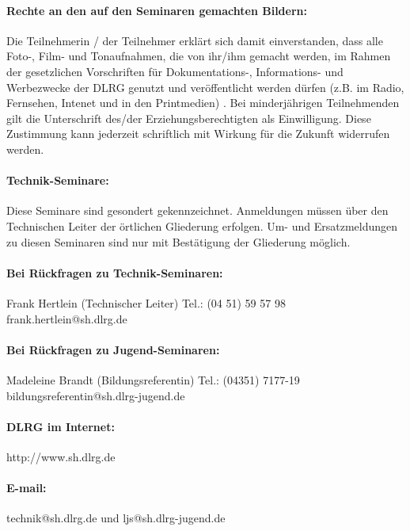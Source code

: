 \paragraph{Rechte an den auf den Seminaren gemachten Bildern:}
Die Teilnehmerin / der Teilnehmer erklärt sich damit einverstanden, dass alle Foto-, Film- und Tonaufnahmen, die von ihr/ihm gemacht werden, 
im Rahmen der gesetzlichen Vorschriften für Dokumentations-, Informations- und Werbezwecke der DLRG genutzt und veröffentlicht werden dürfen 
(z.B. im Radio, Fernsehen, Intenet und in den Printmedien) . Bei minderjährigen Teilnehmenden gilt die Unterschrift des/der Erziehungsberechtigten 
als Einwilligung. Diese Zustimmung kann jederzeit schriftlich mit Wirkung für die Zukunft widerrufen werden.

\paragraph{Technik-Seminare:}
Diese Seminare sind gesondert gekennzeichnet. Anmeldungen müssen über den Technischen Leiter der örtlichen Gliederung erfolgen. 
Um- und Ersatzmeldungen zu diesen Seminaren sind nur mit Bestätigung der Gliederung möglich.

\paragraph{Bei Rückfragen zu Technik-Seminaren:}\par
Frank Hertlein (Technischer Leiter)\newline
Tel.: (04 51) 59 57 98\newline
frank.hertlein@sh.dlrg.de

\paragraph{Bei Rückfragen zu Jugend-Seminaren:}\par
Madeleine Brandt (Bildungsreferentin)\newline
Tel.: (04351) 7177-19\newline
bildungsreferentin@sh.dlrg-jugend.de
\paragraph{DLRG im Internet:} http://www.sh.dlrg.de

\paragraph{E-mail:} technik@sh.dlrg.de und ljs@sh.dlrg-jugend.de
\newpage